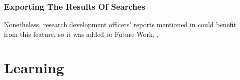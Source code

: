 \label{future-research-officers-reports}

\subsubsection{Exporting The Results Of Searches}
Nonetheless, research development officers' reports mentioned in  could benefit from this feature, so it was added to Future Work, .

\section{Learning}
